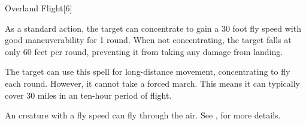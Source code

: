 \begin{spellsection}{Overland Flight}[6]
    \begin{spellheader}
    \end{spellheader}
    \begin{spellcontent}
        \begin{spelltargetinginfo}
        \end{spelltargetinginfo}
        \begin{spelleffects}
            \spelleffect As a standard action, the target can concentrate to gain a 30 foot fly speed with good maneuverability for 1 round. When not concentrating, the target falls at only 60 feet per round, preventing it from taking any damage from landing.

            The target can use this spell for long-distance movement, concentrating to fly each round. However, it cannot take a forced march. This means it can typically cover 30 miles in an ten-hour period of flight.
            \spelldur \durext
        \end{spelleffects}
    \end{spellcontent}
    \begin{spellfooter}
        \spellnotes An \unencumbered creature with a fly speed can fly through the air. See , for more details.
    \end{spellfooter}
    \begin{spellaugments}
    \end{spellaugments}
\end{spellsection}

